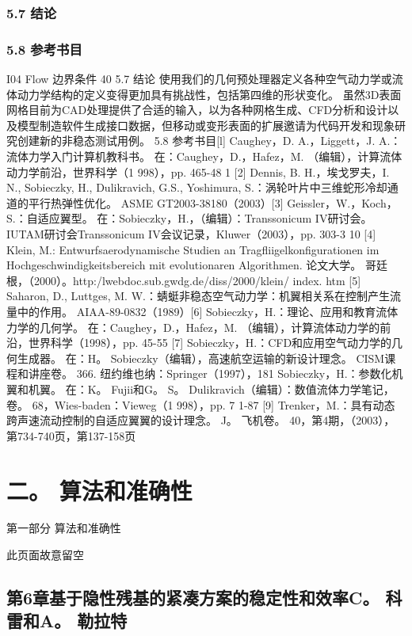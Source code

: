 \documentclass[UTF8,11pt,a4paper,openany,fontset=fandol]{ctexbook}
\begin{document}
\section{5.7 结论}
\section{5.8 参考书目}
I04 Flow 边界条件 40 5.7 结论 使用我们的几何预处理器定义各种空气动力学或流体动力学结构的定义变得更加具有挑战性，包括第四维的形状变化。 虽然3D表面网格目前为CAD处理提供了合适的输入，以为各种网格生成、CFD分析和设计以及模型制造软件生成接口数据，但移动或变形表面的扩展邀请为代码开发和现象研究创建新的非稳态测试用例。 5.8 参考书目[l] Caughey，D. A.，Liggett，J. A.：流体力学入门计算机教科书。 在：Caughey，D.，Hafez，M. （编辑），计算流体动力学前沿，世界科学（1 998），pp. 465-48 1 [2] Dennis, B. H.，埃戈罗夫，I. N., Sobieczky, H., Dulikravich, G.S., Yoshimura, S.：涡轮叶片中三维蛇形冷却通道的平行热弹性优化。 ASME GT2003-38180（2003）[3] Geissler，W.，Koch，S.：自适应翼型。 在：Sobieczky，H.，（编辑）：Transsonicum IV研讨会。 IUTAM研讨会Transsonicum IV会议记录，Kluwer（2003），pp. 303-3 10 [4] Klein, M.: Entwurfsaerodynamische Studien an Tragfliigelkonfigurationen im Hochgeschwindigkeitsbereich mit evolutionaren Algorithmen. 论文大学。 哥廷根，（2000）。http:/lwebdoc.sub.gwdg.de/diss/2000/klein/ index. htm [5] Saharon, D., Luttges, M. W.：蜻蜓非稳态空气动力学：机翼相关系在控制产生流量中的作用。 AIAA-89-0832（1989）[6] Sobieczky，H.：理论、应用和教育流体力学的几何学。 在：Caughey，D.，Hafez，M. （编辑），计算流体动力学的前沿，世界科学（1998），pp. 45-55 [7] Sobieczky，H.：CFD和应用空气动力学的几何生成器。 在：H。 Sobieczky（编辑），高速航空运输的新设计理念。 CISM课程和讲座卷。 366. 纽约维也纳：Springer（1997），181 Sobieczky，H.：参数化机翼和机翼。 在：K。 Fujii和G。 S。 Dulikravich（编辑）：数值流体力学笔记，卷。 68，Wies-baden：Vieweg（1 998），pp. 7 1-87 [9] Trenker，M.：具有动态跨声速流动控制的自适应翼翼的设计理念。 J。 飞机卷。 40，第4期，（2003），第734-740页，第137-158页

\clearpage
\part{二。 算法和准确性}
第一部分 算法和准确性

此页面故意留空

\clearpage
\chapter{第6章基于隐性残基的紧凑方案的稳定性和效率C。 科雷和A。 勒拉特}
\end{document}

